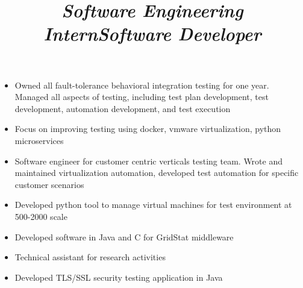 \documentclass[line, margin]{res}
\begin{document}
\begin{resume}
\begin{position}
\begin{itemize}
               \item  Owned all fault-tolerance behavioral integration testing for
                  one year. Managed all aspects of testing, including test plan
                       development, test development, automation development,
                       and test execution

                \item Focus on improving testing using docker, vmware virtualization,
                   python microservices

               \item Software engineer for customer centric verticals testing
                  team. Wrote and maintained virtualization automation, developed
                       test automation for specific customer scenarios\\
                \end{itemize}
   \end{position}

   \title{\sl Software Engineering Intern} 
   \begin{position}
                 \begin{itemize}  \itemsep -2pt %
                 \item Developed python tool to manage virtual machines for 
                    test environment at 500-2000 scale\\
                 
                \end{itemize}
   \end{position}

   \title{\sl Software Developer}
   \begin{position}
            \begin{itemize} \itemsep -2pt
                    \item Developed software in Java and C for GridStat middleware
                    \item Technical assistant for research activities
                    \item Developed TLS/SSL security testing application in Java\\
                \end{itemize}
   \end{position}


\end{resume}
\end{document}
